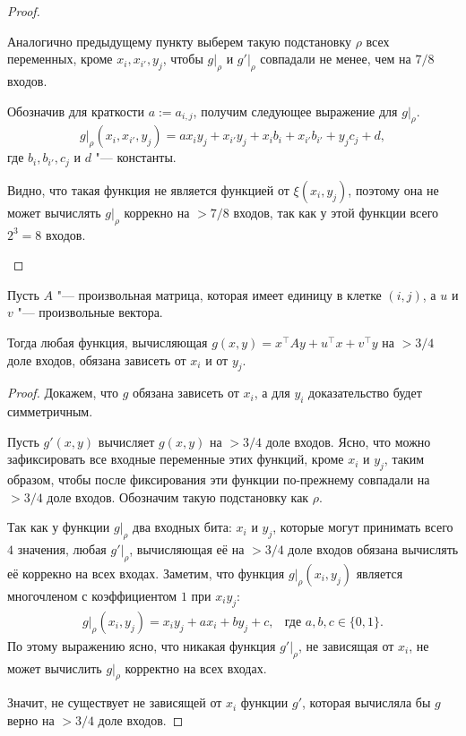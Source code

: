 \documentclass[a4paper, 14pt]{extarticle}
\begin{document}
\begin{proof}
\begin{description}
Аналогично предыдущему пункту выберем такую подстановку $\rho$ всех переменных,
кроме $x_i, x_{i'}, y_j$, чтобы $g \rvert _ \rho$ и $g' \rvert _ \rho$ совпадали
не менее, чем на $7/8$ входов.

Обозначив для краткости $a := a_{i, j}$, получим следующее выражение для $g
\rvert _ \rho$.
\[
g \rvert _ \rho (x_i, x_{i'}, y_j) = a x_i y_j + x_{i'} y_j + x_i b_i + x_{i'} b_{i'} + y_j c_j + d,
\]
где $b_{i}, b_{i'}, c_j$ и $d$ "--- константы.

Видно, что такая функция не является функцией от $\xi(x_i, y_j)$, поэтому она не
может вычислять $g \rvert _ \rho$ коррекно на $> 7/8$ входов, так как у этой
функции всего $2^3 = 8$ входов.
\end{description}
\end{proof}

\begin{lemma} \label{single_one}
Пусть $A$ "--- произвольная матрица, которая имеет единицу в клетке $(i, j)$, а
$u$ и $v$ "--- произвольные вектора.

Тогда любая функция, вычисляющая $g(x, y) = x^\top A y + u^\top x + v^\top y$ на
$> 3/4$ доле входов, обязана зависеть от $x_i$ и от $y_j$.
\end{lemma}
\begin{proof}
Докажем, что $g$ обязана зависеть от $x_i$, а для $y_i$ доказательство будет
симметричным.

Пусть $g'(x, y)$ вычисляет $g(x, y)$ на $> 3/4$ доле входов. Ясно, что можно
зафиксировать все входные переменные этих функций, кроме $x_i$ и $y_j$, таким
образом, чтобы после фиксирования эти функции по-прежнему совпадали на $> 3/4$
доле входов. Обозначим такую подстановку как $\rho$.

Так как у функции $g \rvert _ \rho$ два входных бита: $x_i$ и $y_j$, которые
могут принимать всего $4$ значения, любая $g' \rvert _ \rho$, вычисляющая
её на $> 3/4$ доле входов обязана вычислять её коррекно на всех входах. Заметим,
что функция $g \rvert _ \rho(x_i, y_j)$ является многочленом с коэффициентом $1$
при $x_i y_j$:
\[
\begin{aligned}
&g \rvert _ \rho (x_i, y_j) = x_i y_j + a x_i + b y_j + c,
&
\text{где $a, b, c \in \{0, 1\}$.}&
\end{aligned}
\]
По этому выражению ясно, что никакая функция $g' \rvert _ \rho$, не зависящая от
$x_i$, не может вычислить $g \rvert _ \rho$ корректно на всех входах.

Значит, не существует не зависящей от $x_i$ функции $g'$, которая вычисляла бы
$g$ верно на $> 3/4$ доле входов.
\end{proof}
\end{document}
